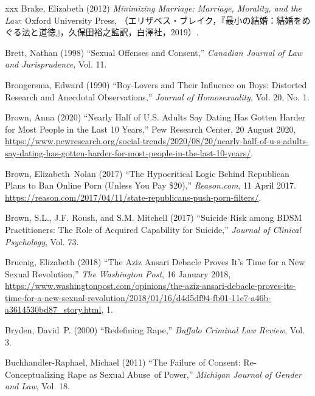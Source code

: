 \documentclass[]{jlreq} \usepackage{mystyle}
\begin{document}
\begin{thebibliography}{xxx}
Brake, Elizabeth (2012)  \textit{ Minimizing Marriage: Marriage, Morality, and
  the Law}: Oxford University Press,
  （エリザベス・ブレイク，『最小の結婚：結婚をめぐる法と道徳』，久保田裕之監訳，白澤社，2019）.

Brett, Nathan (1998) ``Sexual Offenses and Consent,'' \textit{ Canadian Journal
  of Law and Jurisprudence}, Vol. 11.

Brongersma, Edward (1990) ``Boy-Lovers and Their Influence on Boys: Distorted
  Research and Anecdotal Observations,'' \textit{ Journal of Homosexuality},
  Vol. 20, No. 1.

Brown, Anna (2020) ``Nearly Half of U.S. Adults Say Dating Has Gotten Harder
  for Most People in the Last 10 Years,'' Pew Research Center, 20 August 2020,
  \url{https://www.pewresearch.org/social-trends/2020/08/20/nearly-half-of-u-s-adults-say-dating-has-gotten-harder-for-most-people-in-the-last-10-years/}.

Brown, Elizabeth~Nolan (2017) ``The Hypocritical Logic Behind Republican Plans
  to Ban Online Porn (Unless You Pay \$20),'' \emph{Reason.com}, 11 April 2017.
  \url{https://reason.com/2017/04/11/state-republicans-push-porn-filters/}.

Brown, S.L., J.F. Roush, and S.M. Mitchell (2017) ``Suicide Risk among BDSM
  Practitioners: The Role of Acquired Capability for Suicide,'' \textit{
  Journal of Clinical Psychology}, Vol. 73.

Bruenig, Elizabeth (2018) ``The Aziz Ansari Debacle Proves It's Time for a New
  Sexual Revolution,'' \emph{The Washington Post}, 16 January 2018,
  \url{https://www.washingtonpost.com/opinions/the-aziz-ansari-debacle-proves-its-time-for-a-new-sexual-revolution/2018/01/16/d4d5df94-fb01-11e7-a46b-a3614530bd87_story.html},
  1.

Bryden, David~P. (2000) ``Redefining Rape,'' \textit{ Buffalo Criminal Law
  Review}, Vol. 3.

Buchhandler-Raphael, Michael (2011) ``The Failure of Consent:
  Re-Conceptualizing Rape as Sexual Abuse~of Power,'' \textit{ Michigan Journal
  of Gender and Law}, Vol. 18.


\end{thebibliography}
\end{document}
